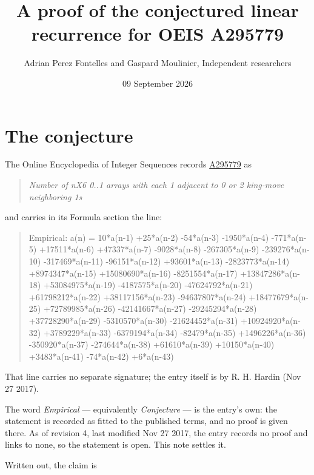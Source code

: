 \documentclass[11pt]{article}
\title{A proof of the conjectured linear recurrence for OEIS A295779}
\author{Adrian Perez Fontelles and Gaspard Moulinier, Independent researchers}
\date{09 September 2026}
\theoremstyle{definition}
\begin{document}
\maketitle
\section{The conjecture}

The Online Encyclopedia of Integer Sequences records \href{https://oeis.org/A295779}{A295779} as

\begin{quote}\itshape Number of nX6 0..1 arrays with each 1 adjacent to 0 or 2 king-move neighboring 1s\end{quote}

and carries in its Formula section the line:

\begin{quote}\ttfamily Empirical: a(n) = 10*a(n-1) +25*a(n-2) -54*a(n-3) -1950*a(n-4) -771*a(n-5) +17511*a(n-6) +47337*a(n-7) -9028*a(n-8) -267305*a(n-9) -239276*a(n-10) -317469*a(n-11) -96151*a(n-12) +93601*a(n-13) -2823773*a(n-14) +8974347*a(n-15) +15080690*a(n-16) -8251554*a(n-17) +13847286*a(n-18) +53084975*a(n-19) -4187575*a(n-20) -47624792*a(n-21) +61798212*a(n-22) +38117156*a(n-23) -94637807*a(n-24) +18477679*a(n-25) +72789985*a(n-26) -42141667*a(n-27) -29245294*a(n-28) +37728290*a(n-29) -5310570*a(n-30) -21624452*a(n-31) +10924920*a(n-32) +3789229*a(n-33) -6379194*a(n-34) -82479*a(n-35) +1496226*a(n-36) -350920*a(n-37) -274644*a(n-38) +61610*a(n-39) +10150*a(n-40) +3483*a(n-41) -74*a(n-42) +6*a(n-43)\end{quote}

That line carries no separate signature; the entry itself is by R. H. Hardin (Nov 27 2017).

The word {\itshape Empirical} --- equivalently {\itshape Conjecture} --- is the entry's own: the statement is recorded as fitted to the published terms, and no proof is given there. As of revision 4, last modified Nov 27 2017, the entry records no proof and links to none, so the statement is open. This note settles it.

Written out, the claim is
\end{document}

